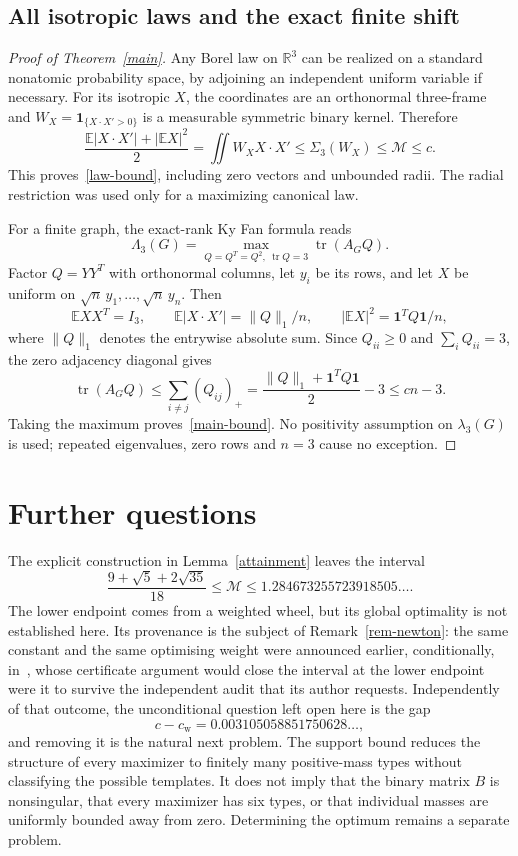 \documentclass[11pt]{article}
\theoremstyle{remark}\newtheorem{remark}[theorem]{Remark}
\newcommand{\E}{\mathbb E}
\newcommand{\R}{\mathbb R}
\newcommand{\cstar}{c_{\mathrm{w}}}
\DeclareMathOperator{\tr}{tr}
\numberwithin{equation}{section}
\begin{document}
\subsection{All isotropic laws and the exact finite shift}
\begin{proof}[Proof of Theorem~\ref{main}]
Any Borel law on $\R^3$ can be realized on a standard nonatomic probability
space, by adjoining an independent uniform variable if necessary.
For its isotropic $X$, the coordinates are an orthonormal three-frame and
$W_X=\mathbf1_{\{X\cdot X'>0\}}$ is a measurable symmetric binary kernel.
Therefore
\[
 \frac{\E|X\cdot X'|+|\E X|^2}{2}
   =\iint W_X X\cdot X'
   \le\Sigma_3(W_X)\le\mathcal M\le c.
\]
This proves~\eqref{law-bound}, including zero vectors and unbounded radii.
The radial restriction was used only for a maximizing canonical law.

For a finite graph, the exact-rank Ky Fan formula reads
\[
 \Lambda_3(G)=\max_{Q=Q^T=Q^2,\ \tr Q=3}\tr(A_GQ).
\]
Factor $Q=YY^T$ with orthonormal columns, let $y_i$ be its rows, and let
$X$ be uniform on $\sqrt n\,y_1,\ldots,\sqrt n\,y_n$. Then
\[
 \E XX^T=I_3,\qquad
 \E|X\cdot X'|=\|Q\|_1/n,\qquad
 |\E X|^2=\boldsymbol1^TQ\boldsymbol1/n,
\]
where $\|Q\|_1$ denotes the entrywise absolute sum.
Since $Q_{ii}\ge0$ and $\sum_iQ_{ii}=3$, the zero adjacency diagonal gives
\[
 \tr(A_GQ)\le\sum_{i\ne j}(Q_{ij})_+
 =\frac{\|Q\|_1+\boldsymbol1^TQ\boldsymbol1}{2}-3
 \le cn-3.
\]
Taking the maximum proves~\eqref{main-bound}. No positivity assumption on
$\lambda_3(G)$ is used; repeated eigenvalues, zero rows and $n=3$ cause
no exception.
\end{proof}

\section{Further questions}\label{sec-further}
The explicit construction in Lemma~\ref{attainment} leaves the interval
\[
 \frac{9+\sqrt5+2\sqrt{35}}{18}\le\mathcal M
       \le1.284673255723918505\ldots.
\]
The lower endpoint comes from a weighted wheel, but its global optimality
is not established here. Its provenance is the subject of
Remark~\ref{rem-newton}: the same constant and the same optimising weight
were announced earlier, conditionally, in~\cite{Newton1,Newton2}, whose
certificate argument would close the interval at the lower endpoint were it
to survive the independent audit that its author requests. Independently of
that outcome, the unconditional question left open here is the gap
\[
 c-\cstar=0.003105058851750628\ldots,
\]
and removing it is the natural next problem. The support bound reduces the
structure of every
maximizer to finitely many positive-mass types without classifying the
possible templates. It does not imply that the binary matrix $B$ is
nonsingular, that every maximizer has six types, or that individual masses
are uniformly bounded away from zero. Determining the optimum remains
a separate problem.
\end{document}
